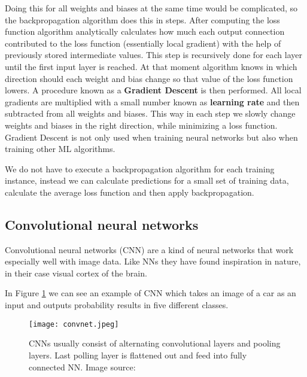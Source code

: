 Doing this for all weights and biases at the same time would be complicated, so the backpropagation algorithm does this in steps.
After computing the loss function algorithm analytically calculates how much each output connection contributed to the loss function (essentially local gradient) with the help of previously stored intermediate values.
This step is recursively done for each layer until the first input layer is reached.
At that moment algorithm knows in which direction should each weight and bias change so that value of the loss function lowers.
A procedure known as a \textbf{Gradient Descent} is then performed.
All local gradients are multiplied with a small number known as \textbf{learning rate} and then subtracted from all weights and biases.
This way in each step we slowly change weights and biases in the right direction, while minimizing a loss function.
Gradient Descent is not only used when training neural networks but also when training other ML algorithms.

We do not have to execute a backpropagation algorithm for each training instance, instead we can calculate predictions for a small set of training data, calculate the average loss function and then apply backpropagation.


\subsection{ Convolutional neural networks}

Convolutional neural networks (CNN) are a kind of neural networks that work especially well with image data.
Like NNs they have found inspiration in nature, in their case visual cortex of the brain.\footnotemark



In Figure \ref{convnet} we can see an example of CNN which takes an image of a car as an input and outputs probability results in five different classes.
\newline

\begin{figure}[ht]
        \centering
        \texttt{[image: convnet.jpeg]} 
        \caption{CNNs usually consist of alternating convolutional layers and pooling layers. Last polling layer is flattened out and feed into fully connected NN. Image source:\cite{cs231n}}
        \label{convnet}
\end{figure}

